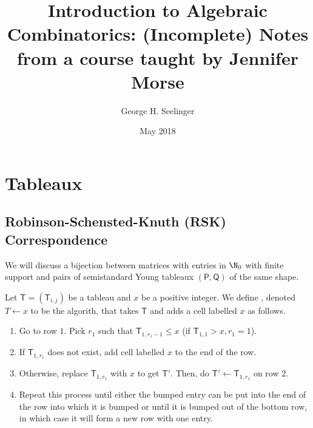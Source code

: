 \documentclass[11pt,leqno,oneside]{amsart}
\title[Algebraic Combinatorics]{Introduction to Algebraic
  Combinatorics: (Incomplete) Notes from a course taught by Jennifer Morse}
\author{George H. Seelinger}
\date{May 2018}
\numberwithin{thm}{section}
\newcommand{\T}{\mathsf{T}} %
\newcommand{\TP}{\mathsf{P}}
\newcommand{\TQ}{\mathsf{Q}}
\begin{document}
\maketitle
\section{Tableaux}
\subsection{Robinson-Schensted-Knuth (RSK) Correspondence}
We will discuss a bijection between matrices with entries in \(\N_0\)
with finite support and pairs of semistandard Young tableaux \((\TP,
\TQ)\) of the same shape. 
\begin{defn}
  Let \(\T = (\T_{i,j})\) be a tableau and \(x\) be a positive
  integer. We define 
  , denoted \(T \leftarrow x\) to be the algorith,
  that takes \(\T\) and adds a cell labelled \(x\) as follows.
  \begin{enumerate}[label=(\arabic*)]
  \item Go to row \(1\). Pick \(r_1\) such that \(\T_{1,r_1-1} \leq x\)
    (if \(\T_{1,1} > x, r_1=1\)).
  \item If \(\T_{1,r_1}\) does not exist, add
    cell labelled \(x\) to the end of the row.
  \item Otherwise, replace \(\T_{1,r_1}\) with \(x\) to get
    \(\T'\). Then, do \(\T' \leftarrow \T_{1,r_1}\) on row \(2\).
  \item Repeat this process until either the bumped entry can be put
    into the end of the row into which it is bumped or until it is
    bumped out of the bottom row, in which case it will form a new row
    with one entry. 
  \end{enumerate}
\end{defn}
\end{document}
